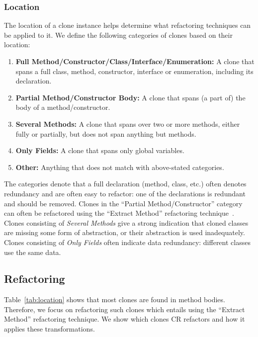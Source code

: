 \documentclass[sigconf,review,anonymous]{acmart}
\begin{document}
\subsubsection{Location}\label{sec:location}
The location of a clone instance helps determine what refactoring techniques can be applied to it. We define the following categories of clones based on their location:
\begin{enumerate}
  \item \textbf{Full Method/Constructor/Class/Interface/Enumeration:} A clone that spans a full class, method, constructor, interface or enumeration, including its declaration.
  \item \textbf{Partial Method/Constructor Body:} A clone that spans (a part of) the body of a method/constructor.
  \item \textbf{Several Methods:} A clone that spans over two or more methods, either fully or partially, but does not span anything but methods.
  \item \textbf{Only Fields:} A clone that spans only global variables.
  \item \textbf{Other:} Anything that does not match with above-stated categories.
\end{enumerate}
The categories denote that a full declaration (method, class, etc.) often denotes redundancy and are often easy to refactor: one of the declarations is redundant and should be removed. Clones in the ``Partial Method/Constructor'' category can often be refactored using the ``Extract Method'' refactoring technique~\cite{mazinanian2016jdeodorant}. Clones consisting of \textit{Several Methods} give a strong indication that cloned classes are missing some form of abstraction, or their abstraction is used inadequately. Clones consisting of \textit{Only Fields} often indicate data redundancy: different classes use the same data.

\subsection{Refactoring}\label{sec:refactoring}
Table~\ref{tab:location} shows that most clones are found in method bodies. Therefore, we focus on refactoring such clones which entails using the ``Extract Method'' refactoring technique. We show which clones CR refactors and how it applies these transformations.
\end{document}
